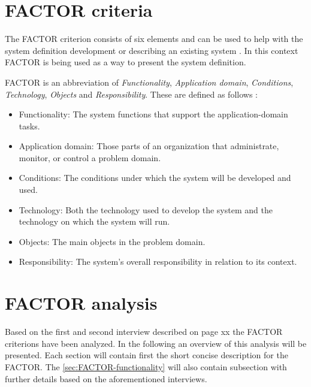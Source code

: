 \section{FACTOR criteria} \label{sec:factorcriteria}
The FACTOR criterion consists of six elements and can be used to help with the system definition development or describing an existing system
. 
In this context FACTOR is being used as a way to present the system definition.

FACTOR is an abbreviation of \textit{Functionality}, \textit{Application domain}, \textit{Conditions}, \textit{Technology}, \textit{Objects} and \textit{Responsibility}.
These are defined as follows \citep[p.~40]{Rod-Aalborg}:
\begin{itemize}
	\item
	 Functionality: 
	 The system functions that support the application-domain tasks.
	\item
	 Application domain: 
	 Those parts of an organization that administrate, monitor, or control a problem domain.
	\item
	 Conditions: 
	 The conditions under which the system will be developed and used.
	\item
	 Technology: 
	 Both the technology used to develop the system and the technology on which the system will run.
	\item
	 Objects: 
	 The main objects in the problem domain.
	\item
	 Responsibility: 
	 The system’s overall responsibility in relation to its context.
\end{itemize}

\section{FACTOR analysis}
Based on the first and second interview described on page xx the FACTOR criterions have been analyzed. 
In the following an overview of this analysis will be presented.
Each section will contain first the short concise description for the FACTOR. 
The \cref{sec:FACTOR-functionality} will also contain subsection with further details based on the aforementioned interviews. 
